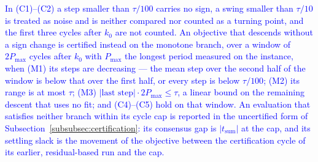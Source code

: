 \textcolor{blue}{
    In (C1)--(C2) a step smaller than $\tau/100$ carries no sign, a swing smaller than $\tau/10$ is treated as noise and is neither compared nor counted as a turning point, and the first three cycles after $k_0$ are not counted. An objective that descends without a sign change is certified instead on the monotone branch, over a window of $2P_{\max}$ cycles after $k_0$ with $P_{\max}$ the longest period measured on the instance, when (M1) its steps are decreasing --- the mean step over the second half of the window is below that over the first half, or every step is below $\tau/100$; (M2) its range is at most $\tau$; (M3) $|\text{last step}| \cdot 2P_{\max} \le \tau$, a linear bound on the remaining descent that uses no fit; and (C4)--(C5) hold on that window. An evaluation that satisfies neither branch within its cycle cap is reported in the uncertified form of Subsection~\ref{subsubsec:certification}: its consensus gap is $|t_{\text{sum}}|$ at the cap, and its settling slack is the movement of the objective between the certification cycle of its earlier, residual-based run and the cap.
}
